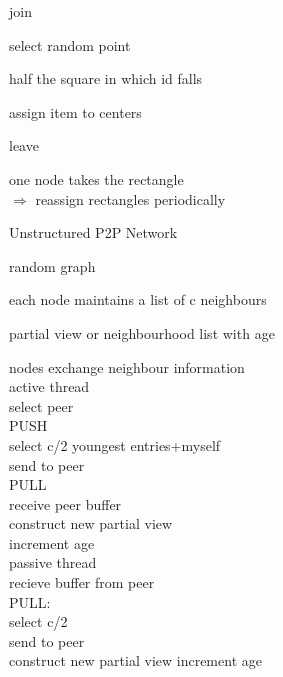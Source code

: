 \documentclass[ngerman,a4paper]{report}
\begin{document}
\begin{compactenum}
\begin{compactitem}
\item join\begin{compactitem}
\item select random point
\item half the square in which id falls
\item assign item to centers
\end{compactitem}
\item leave\begin{compactitem}
\item one node takes the rectangle\\
$\Rightarrow$ reassign rectangles periodically
\end{compactitem}
\end{compactitem}

Unstructured P2P Network\\
\begin{compactitem}
\item random graph
\item each node maintains a list of c neighbours
\item partial view or neighbourhood list  with age
\item nodes exchange neighbour information \\active thread\\ select peer\\

PUSH\\
select c/2 youngest entries+myself\\
send to peer\\

PULL\\
receive peer buffer\\
construct new partial view\\
increment age\\

passive thread\\
recieve buffer from peer\\

PULL:\\
select c/2\\
send to peer\\
construct new partial view
increment age\\

\end{compactitem}

\end{compactenum}



\end{document}

